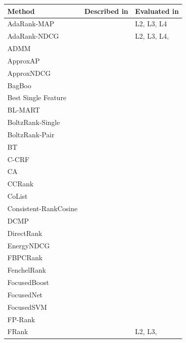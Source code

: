 \documentclass[english, authoryear, preprint]{elsarticle}
\begin{document}
{\fontsize{5.5pt}{5.4pt}\selectfont
\begin{longtable}{p{2.671cm}p{2.812cm}p{7.7cm}}\toprule
Method & Described in & Evaluated in\\
\midrule
AdaRank-MAP & \cite{Xu2007} & L2, L3, L4 \\
AdaRank-NDCG & \cite{Xu2007} & L2, L3, L4,  \cite{Busa-Fekete2013,Tan2013} \\ 
ADMM & \cite{Duh2011} & \cite{Duh2011} \\ 
ApproxAP & \cite{Qin2010b} & \cite{Qin2010b} \\ 
ApproxNDCG & \cite{Qin2010b} & \cite{Qin2010b} \\ 
BagBoo & \cite{Pavlov2010} & \cite{Ganjisaffar2011c} \\ 
Best Single Feature &  & \cite{Gomes2013} \\ 
BL-MART & \cite{Ganjisaffar2011c} & \cite{Ganjisaffar2011c} \\ 
BoltzRank-Single & \cite{Volkovs2009} & \cite{Volkovs2009, Volkovs2013} \\ 
BoltzRank-Pair & \cite{Volkovs2009} & \cite{Volkovs2009, Ganjisaffar2011c, Volkovs2013} \\ 
BT & \cite{Zhou2008} & \cite{Zhou2008} \\ 
C-CRF & \cite{Qin2008b} & \cite{Qin2008b} \\ 
CA & \cite{Metzler2007} & \cite{Busa-Fekete2013,Tan2013} \\ 
CCRank & \cite{Wang2011c} & \cite{Wang2011c} \\ 
CoList & \cite{Gao2014} & \cite{Gao2014} \\
Consistent-RankCosine & \cite{Ravikumar2011} & \cite{Tan2013} \\
DCMP & \cite{Renjifo2012}  & \cite{Renjifo2012}  \\
DirectRank & \cite{Tan2013} & \cite{Tan2013} \\
EnergyNDCG & \cite{Freno2011} & \cite{Freno2011} \\
FBPCRank & \cite{Lai2011} & \cite{Lai2011} \\
FenchelRank & \cite{Lai2013} & \cite{Lai2013, Lai2013b, Laporte2013} \\ 
FocusedBoost & \cite{Niu2012} & \cite{Niu2012} \\ 
FocusedNet & \cite{Niu2012} & \cite{Niu2012} \\ 
FocusedSVM & \cite{Niu2012} & \cite{Niu2012} \\ 
FP-Rank & \cite{Song2013} & \cite{Song2013} \\ 
FRank & \cite{Tsai2007} & L2, L3, \cite{Wang2012} \\ 

\end{longtable}}
\end{document}
